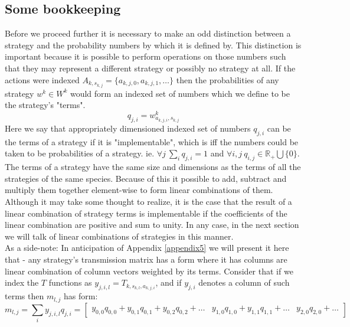 \subsection{Some bookkeeping}

Before we proceed further it is necessary to make an odd distinction between a strategy and the probability numbers by which it is defined by. This distinction is important because it is possible to perform operations on those numbers such that they may represent a different strategy or possibly no strategy at all.
If the actions were indexed $A_{k,s_{k,j}}=\{a_{k,j,0},a_{k,j,1},\dots\}$ then the probabilities of any strategy $w^k\in W^k$ would form an indexed set of numbers which we define to be the strategy's "terms".
\begin{equation}\label{eq:probability_indices}q_{j,i}=w^k_{a_{k,j,i},s_{k,j}}\end{equation}
Here we say that appropriately dimensioned indexed set of numbers $q_{j,i}$ can be the terms of a strategy if it is "implementable", which is iff the numbers could be taken to be probabilities of a strategy.
ie. $\forall j~\sum_iq_{j,i}=1$ and $\forall i,j~q_{i,j}\in\mathbb{R}_+\bigcup\{0\}$.\\
The terms of a strategy have the same size and dimensions as the terms of all the strategies of the same species. Because of this it possible to add, subtract and multiply them together element-wise to form linear combinations of them.
Although it may take some thought to realize, it is the case that the result of a linear combination of strategy terms is implementable if the coefficients of the linear combination are positive and sum to unity.
In any case, in the next section we will talk of linear combinations of strategies in this manner.
\\

As a side-note: In anticipation of Appendix \ref{appendix5} we will present it here that - any strategy's transmission matrix has a form where it has columns are linear combination of column vectors weighted by its terms. Consider that if we index the $T$ functions as $y_{j,i,l}=T_{k,s_{k,l},a_{k,j,i}}$, and if $y_{j,i}$ denotes a column of such terms then $m_{l,j}$ has form:
\begin{equation}\label{eq:columns} m_{l,j} = \sum_iy_{j,i,l}q_{j,i} = \left[\begin{array}{c|c|c}
y_{0,0}q_{0,0}+y_{0,1}q_{0,1}+y_{0,2}q_{0,2}+\dots & 
y_{1,0}q_{1,0}+y_{1,1}q_{1,1}+\dots & 
y_{2,0}q_{2,0}+\dots
\end{array}\right]\end{equation}
